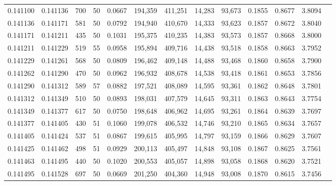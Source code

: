\begin{tabular}{rrrrrrrrrrrrr}
0.141100 & 0.141136 &   700 &  50 &                                     0.0667 & 194,359 & 411,251 &  14,283 &  93,673 & 0.1855 & 0.8677 & 3.8094 \\
0.141136 & 0.141171 &   581 &  50 &                                     0.0792 & 194,940 & 410,670 &  14,333 &  93,623 & 0.1857 & 0.8672 & 3.8040 \\
0.141171 & 0.141211 &   435 &  50 &                                     0.1031 & 195,375 & 410,235 &  14,383 &  93,573 & 0.1857 & 0.8668 & 3.8000 \\
0.141211 & 0.141229 &   519 &  55 &                                     0.0958 & 195,894 & 409,716 &  14,438 &  93,518 & 0.1858 & 0.8663 & 3.7952 \\
0.141229 & 0.141261 &   568 &  50 &                                     0.0809 & 196,462 & 409,148 &  14,488 &  93,468 & 0.1860 & 0.8658 & 3.7900 \\
0.141262 & 0.141290 &   470 &  50 &                                     0.0962 & 196,932 & 408,678 &  14,538 &  93,418 & 0.1861 & 0.8653 & 3.7856 \\
0.141290 & 0.141312 &   589 &  57 &                                     0.0882 & 197,521 & 408,089 &  14,595 &  93,361 & 0.1862 & 0.8648 & 3.7801 \\
0.141312 & 0.141349 &   510 &  50 &                                     0.0893 & 198,031 & 407,579 &  14,645 &  93,311 & 0.1863 & 0.8643 & 3.7754 \\
0.141349 & 0.141377 &   617 &  50 &                                     0.0750 & 198,648 & 406,962 &  14,695 &  93,261 & 0.1864 & 0.8639 & 3.7697 \\
0.141377 & 0.141405 &   430 &  51 &                                     0.1060 & 199,078 & 406,532 &  14,746 &  93,210 & 0.1865 & 0.8634 & 3.7657 \\
0.141405 & 0.141424 &   537 &  51 &                                     0.0867 & 199,615 & 405,995 &  14,797 &  93,159 & 0.1866 & 0.8629 & 3.7607 \\
0.141425 & 0.141462 &   498 &  51 &                                     0.0929 & 200,113 & 405,497 &  14,848 &  93,108 & 0.1867 & 0.8625 & 3.7561 \\
0.141463 & 0.141495 &   440 &  50 &                                     0.1020 & 200,553 & 405,057 &  14,898 &  93,058 & 0.1868 & 0.8620 & 3.7521 \\
0.141495 & 0.141528 &   697 &  50 &                                     0.0669 & 201,250 & 404,360 &  14,948 &  93,008 & 0.1870 & 0.8615 & 3.7456 \\

\end{tabular}
